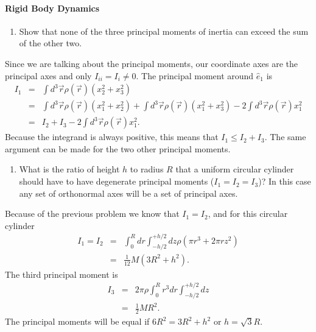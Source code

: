 \documentclass[letterpaper,11pt]{article}
\begin{document}
\paragraph*{Rigid Body Dynamics}
\begin{enumerate}[resume]
 \item Show that none of the three principal moments of inertia can exceed the sum of the other two.
\end{enumerate}

Since we are talking about the principal moments, our coordinate axes are the principal axes and only $I_{ii} = I_i \ne 0$.  The principal moment around $\hat{e}_1$ is
\begin{eqnarray*}
 I_1 & = & \int d^3\vec{r} \rho(\vec{r}) (x_2^2 + x_3^2) \\
 & = & \int d^3\vec{r} \rho(\vec{r}) (x_1^2 + x_2^2) + \int d^3\vec{r} \rho(\vec{r}) (x_1^2 + x_3^2) - 2 \int d^3\vec{r} \rho(\vec{r}) x_1^2 \\
 & = & I_2 + I_3 - 2 \int d^3\vec{r} \rho(\vec{r}) x_1^2.
\end{eqnarray*}
Because the integrand is always positive, this means that $I_1 \le I_2 + I_3$.  The same argument can be made for the two other principal moments.


\begin{enumerate}[resume]
 \item What is the ratio of height $h$ to radius $R$ that a uniform circular cylinder should have to have degenerate principal moments ($I_1 = I_2 = I_3$)?  In this case any set of orthonormal axes will be a set of principal axes.
\end{enumerate}

Because of the previous problem we know that $I_1 = I_2$, and for this circular cylinder
\begin{eqnarray*}
 I_1 = I_2 & = & \int_0^R dr \int_{-h/2}^{+h/2} dz \rho \left( \pi r^3 + 2 \pi r z^2 \right) \\
 & = & \frac{1}{12} M (3 R^2 + h^2).
\end{eqnarray*}
The third principal moment is
\begin{eqnarray*}
 I_3 & = & 2 \pi \rho \int_0^R r^3 dr \int_{-h/2}^{+h/2} dz \\
 & = & \frac{1}{2} M R^2.
\end{eqnarray*}
The principal moments will be equal if $6 R^2 = 3 R^2 + h^2$ or $h = \sqrt{3} R$.
\end{document}
